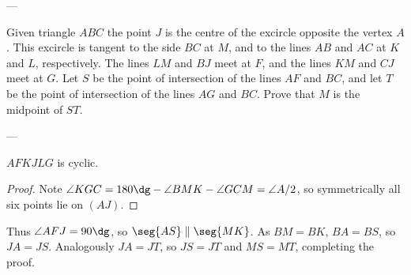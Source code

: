 
---

Given triangle $ABC$ the point $J$ is the centre of the excircle opposite the vertex $A$. This excircle is tangent to the side $BC$ at $M$, and to the lines $AB$ and $AC$ at $K$ and $L$, respectively. The lines $LM$ and $BJ$ meet at $F$, and the lines $KM$ and $CJ$ meet at $G$. Let $S$ be the point of intersection of the lines $AF$ and $BC$, and let $T$ be the point of intersection of the lines $AG$ and $BC$. Prove that $M$ is the midpoint of $ST$.

---

\begin{iclaim*}
    $AFKJLG$ is cyclic.
\end{iclaim*}
\begin{proof}
    Note $\angle KGC=180\dg-\angle BMK-\angle GCM=\angle A/2$, so symmetrically all six points lie on $(AJ)$.
\end{proof}

Thus $\angle AFJ=90\dg$, so $\seg{AS}\parallel\seg{MK}$. As $BM=BK$, $BA=BS$, so $JA=JS$. Analogously $JA=JT$, so $JS=JT$ and $MS=MT$, completing the proof.

